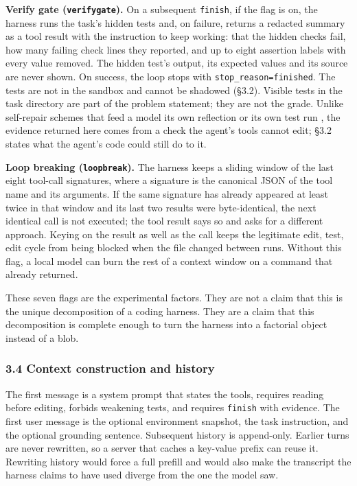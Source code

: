 \documentclass[
  10pt,
  a4paper,
]{article}
\let\oldtexttt\texttt
\renewcommand{\texttt}[1]{{\small\oldtexttt{#1}}}
\begin{document}
\textbf{Verify gate (\texttt{verifygate}).} On a subsequent
\texttt{finish}, if the flag is on, the harness runs the task's hidden
tests and, on failure, returns a redacted summary as a tool result with
the instruction to keep working: that the hidden checks fail, how many
failing check lines they reported, and up to eight assertion labels with
every value removed. The hidden test's output, its expected values and
its source are never shown. On success, the loop stops with
\texttt{stop\_reason=finished}. The tests are not in the sandbox and
cannot be shadowed (§3.2). Visible tests in the task directory are part
of the problem statement; they are not the grade. Unlike self-repair
schemes that feed a model its own reflection or its own test run
\citep{chen2023selfdebug, li2024ldb}, the evidence returned here comes
from a check the agent's tools cannot edit; §3.2 states what the agent's
code could still do to it.

\textbf{Loop breaking (\texttt{loopbreak}).} The harness keeps a sliding
window of the last eight tool-call signatures, where a signature is the
canonical JSON of the tool name and its arguments. If the same signature
has already appeared at least twice in that window and its last two
results were byte-identical, the next identical call is not executed;
the tool result says so and asks for a different approach. Keying on the
result as well as the call keeps the legitimate edit, test, edit cycle
from being blocked when the file changed between runs. Without this
flag, a local model can burn the rest of a context window on a command
that already returned.

These seven flags are the experimental factors. They are not a claim
that this is the unique decomposition of a coding harness. They are a
claim that this decomposition is complete enough to turn the harness
into a factorial object instead of a blob.

\subsubsection{3.4 Context construction and
history}\label{context-construction-and-history}

The first message is a system prompt that states the tools, requires
reading before editing, forbids weakening tests, and requires
\texttt{finish} with evidence. The first user message is the optional
environment snapshot, the task instruction, and the optional grounding
sentence. Subsequent history is append-only. Earlier turns are never
rewritten, so a server that caches a key-value prefix can reuse it.
Rewriting history would force a full prefill and would also make the
transcript the harness claims to have used diverge from the one the
model saw.
\end{document}
